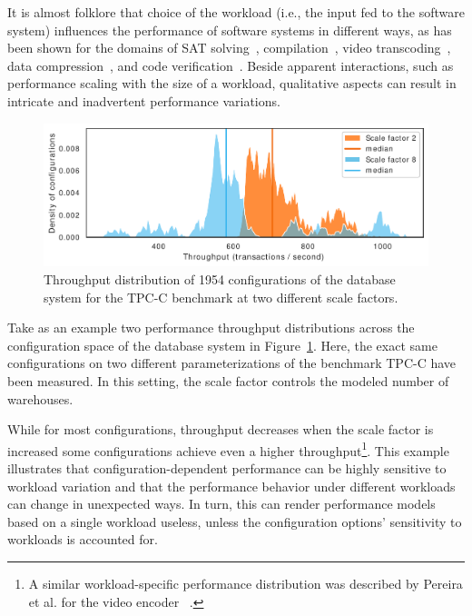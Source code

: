 It is almost folklore that choice of the workload (i.e., the input fed to the software system) influences the performance of software systems in different ways\cite{benchmarking_book}, as has been shown for the domains of SAT solving~\cite{falkner_sat_solvers_2015,satzilla_2008}, compilation~\cite{ding_compilation_2015,plotnikov_compilation_2013}, video transcoding~\cite{maxiaguine_workload_2004,alves_sampling_2020}, data compression~\cite{khavari_compression_2019}, and code verification~\cite{koc_satune_2021}. Beside apparent interactions, such as performance scaling with the size of a workload, qualitative aspects can result in intricate and inadvertent performance variations.

\begin{figure}
	\centering
	\includegraphics[width=\linewidth]{images/h2_intro.pdf}
	\caption{Throughput distribution of 1954 configurations of the database system \htwo for the \textsf{TPC-C} benchmark at two different scale factors.}
	\label{fig:h2_intro}
\end{figure}

Take as an example two performance throughput distributions across the configuration space of the database system \htwo in Figure~\ref{fig:h2_intro}. Here,  the exact same configurations on two different parameterizations of the benchmark \textsf{TPC-C} have been measured. In this setting, the scale factor controls the modeled number of warehouses. 

While for most configurations, throughput decreases when the scale factor is increased some configurations achieve even a higher throughput\footnote{A similar workload-specific performance distribution was  described by Pereira et al. for the video encoder \xzwo~\cite{alves_sampling_2020}.}. This example illustrates that configuration-dependent performance can be highly sensitive to workload variation and that the performance behavior under different workloads can change in unexpected ways. In turn, this can render performance models based on a single workload useless, unless the configuration options’ sensitivity to workloads is accounted for.

